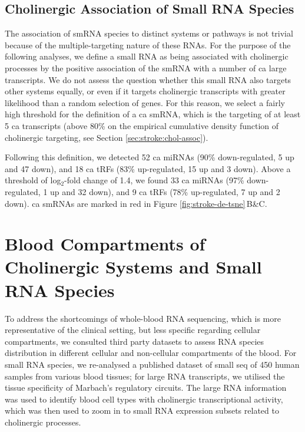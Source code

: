 \subsection{Cholinergic Association of Small RNA Species}
The association of smRNA species to distinct systems or pathways is not trivial because of the multiple-targeting nature of these RNAs. For the purpose of the following analyses, we define a small RNA as being associated with cholinergic processes by the positive association of the smRNA with a number of \acf{ca} large transcripts. We do not assess the question whether this small RNA also targets other systems equally, or even if it targets cholinergic transcripts with greater likelihood than a random selection of genes. For this reason, we select a fairly high threshold for the definition of a \ac{ca} smRNA, which is the targeting of at least 5 \ac{ca} transcripts (above 80\% on the empirical cumulative density function of cholinergic targeting, see Section \ref{sec:stroke:chol-assoc}).

Following this definition, we detected 52 \ac{ca} miRNAs (90\% down-regulated, 5 up and 47 down), and 18 \ac{ca} tRFs (83\% up-regulated, 15 up and 3 down). Above a threshold of log$_2$-fold change of 1.4, we found 33 \ac{ca} miRNAs (97\% down-regulated, 1 up and 32 down), and 9 \ac{ca} tRFs (78\% up-regulated, 7 up and 2 down). \ac{ca} smRNAs are marked in red in Figure \ref{fig:stroke-de-tsne}\,B\&C.

\section{Blood Compartments of Cholinergic Systems and Small RNA Species}
To address the shortcomings of whole-blood RNA sequencing, which is more representative of the clinical setting, but less specific regarding cellular compartments, we consulted third party datasets to assess RNA species distribution in different cellular and non-cellular compartments of the blood. For small RNA species, we re-analysed a published dataset of small \ac{seq} of 450 human samples from various blood tissues;\cite{Juzenas2017} for large RNA transcripts, we utilised the tissue specificity of Marbach's regulatory circuits.\cite{Marbach2016} The large RNA information was used to identify blood cell types with cholinergic transcriptional activity, which was then used to zoom in to small RNA expression subsets related to cholinergic processes.

